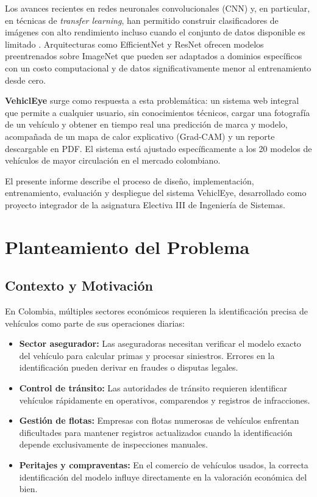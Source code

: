 \documentclass[12pt,a4paper]{article}
\begin{document}
Los avances recientes en redes neuronales convolucionales (CNN) y, en particular, en técnicas de \textit{transfer learning}, han permitido construir clasificadores de imágenes con alto rendimiento incluso cuando el conjunto de datos disponible es limitado \cite{tan2019efficientnet}. Arquitecturas como EfficientNet \cite{tan2019efficientnet} y ResNet \cite{he2016deep} ofrecen modelos preentrenados sobre ImageNet que pueden ser adaptados a dominios específicos con un costo computacional y de datos significativamente menor al entrenamiento desde cero.

\textbf{VehiclEye} surge como respuesta a esta problemática: un sistema web integral que permite a cualquier usuario, sin conocimientos técnicos, cargar una fotografía de un vehículo y obtener en tiempo real una predicción de marca y modelo, acompañada de un mapa de calor explicativo (Grad-CAM) y un reporte descargable en PDF. El sistema está ajustado específicamente a los 20 modelos de vehículos de mayor circulación en el mercado colombiano.

El presente informe describe el proceso de diseño, implementación, entrenamiento, evaluación y despliegue del sistema VehiclEye, desarrollado como proyecto integrador de la asignatura Electiva III de Ingeniería de Sistemas.

\section{Planteamiento del Problema}

\subsection{Contexto y Motivación}

En Colombia, múltiples sectores económicos requieren la identificación precisa de vehículos como parte de sus operaciones diarias:

\begin{itemize}
    \item \textbf{Sector asegurador:} Las aseguradoras necesitan verificar el modelo exacto del vehículo para calcular primas y procesar siniestros. Errores en la identificación pueden derivar en fraudes o disputas legales.
    \item \textbf{Control de tránsito:} Las autoridades de tránsito requieren identificar vehículos rápidamente en operativos, comparendos y registros de infracciones.
    \item \textbf{Gestión de flotas:} Empresas con flotas numerosas de vehículos enfrentan dificultades para mantener registros actualizados cuando la identificación depende exclusivamente de inspecciones manuales.
    \item \textbf{Peritajes y compraventas:} En el comercio de vehículos usados, la correcta identificación del modelo influye directamente en la valoración económica del bien.
\end{itemize}
\end{document}
